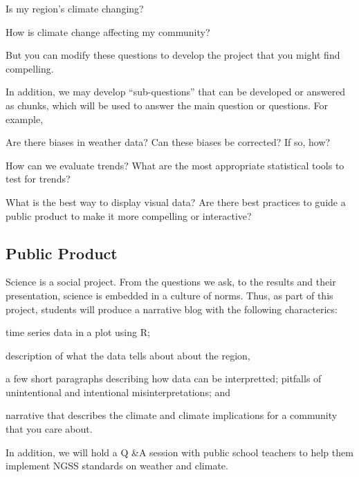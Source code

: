 \documentclass{article}\usepackage[]{graphicx}\usepackage[]{color}
\newenvironment{itemize*}%
  {\begin{itemize}%
    \setlength{\itemsep}{0pt}%
    \setlength{\parskip}{0pt}}%
  {\end{itemize}}
\begin{document}
\begin{itemize*}
  \item Is my region's climate changing?
  \item How is climate change affecting my community?
\end{itemize*}

But you can modify these questions to develop the project that you might find compelling.

In addition, we may develop ``sub-questions'' that can be developed or answered as chunks, which will be used to answer the main question or questions. For example, 

\begin{itemize*}
  \item Are there biases in weather data? Can these biases be corrected? If so, how?
  \item How can we evaluate trends? What are the most appropriate statistical tools to test for trends?
  \item What is the best way to display visual data?  Are there best practices to guide a public product to make it more compelling or interactive?
\end{itemize*}

\subsection{Public Product}

Science is a social project. From the questions we ask, to the results and their presentation, science is embedded in a culture of norms. Thus, as part of this project, students will produce a narrative blog with the following characterics:

\begin{itemize*}
  \item time series data in a plot using R; 
  \item description of what the data tells about about the region, 
  \item a few short paragraphs describing how data can be interpretted; pitfalls of unintentional and intentional misinterpretations; and 
  \item narrative that describes the climate and climate implications for a community that you care about.
\end{itemize*}

In addition, we will hold a Q \&A session with public school teachers to help them implement NGSS standards on weather and climate.
\end{document}
